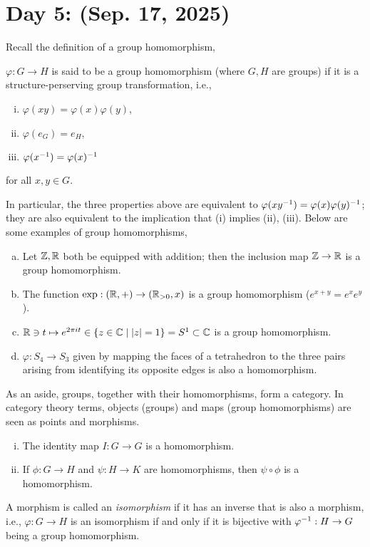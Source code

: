 \section{Day 5: (Sep. 17, 2025)}
Recall the definition of a group homomorphism,
\begin{definition}
    $\varphi : G \to H$ is said to be a group homomorphism (where $G, H$ are groups) if it is a structure-perserving group transformation, i.e.,
    \begin{enumerate}[(i)]
        \item $\varphi(xy) = \varphi(x) \varphi(y)$,
        \item $\varphi(e_G) = e_H$,
        \item $\varphi(x ^{-1}) = \varphi(x) ^{-1}$
    \end{enumerate}
    for all $x, y \in G$.
\end{definition}
\noindent In particular, the three properties above are equivalent to $\varphi(xy ^{-1}) = \varphi(x) \varphi(y) ^{-1}$; they are also equivalent to the implication that (i) implies (ii), (iii). Below are some examples of group homomorphisms,
\begin{enumerate}[(a)]
    \item Let $\mathbb Z, \mathbb R$ both be equipped with addition; then the inclusion map $\mathbb Z \to \mathbb R$ is a group homomorphism.
    \item The function $\exp : (\mathbb R, +) \to (\mathbb R_{>0}, x)$ is a group homomorphism ($e^{x+y} = e^x e^y$).
    \item $\mathbb R \ni t \mapsto e^{2\pi i t} \in \{z \in \mathbb C \mid \left\lvert z \right\rvert = 1\} = S^1 \subset \mathbb C$ is a group homomorphism.
    \item $\varphi : S_4 \to S_3$ given by mapping the faces of a tetrahedron to the three pairs arising from identifying its opposite edges is also a homomorphism. 
\end{enumerate}
\noindent As an aside, groups, together with their homomorphisms, form a category. In category theory terms, objects (groups) and maps (group homomorphisms) are seen as points and morphisms.
\begin{enumerate}[(i)]
    \item The identity map $I : G \to G$ is a homomorphism.
    \item If $\phi : G \to H$ and $\psi : H \to K$ are homomorphisms, then $\psi \circ \phi$ is a homomorphism.
\end{enumerate}
A morphism is called an \textit{isomorphism} if it has an inverse that is also a morphism, i.e., $\varphi : G \to H$ is an isomorphism if and only if it is bijective with $\varphi ^{-1} : H \to G$ being a group homomorphism.
